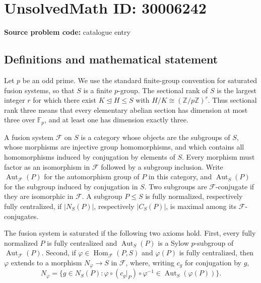 \documentclass[11pt]{article}
\newcommand{\Z}{\mathbb{Z}}
\newcommand{\F}{\mathbb{F}}
\begin{document}
\section*{UnsolvedMath ID: 30006242}
\textbf{Source problem code:} catalogue entry
\subsection{Definitions and mathematical statement}
Let \(p\) be an odd prime. We use the standard finite-group convention for saturated fusion systems, so that \(S\) is a finite \(p\)-group. The sectional rank of \(S\) is the largest integer \(r\) for which there exist \(K\trianglelefteq H\leq S\) with \(H/K\cong (\Z/p\Z)^r\). Thus sectional rank three means that every elementary abelian section has dimension at most three over \(\F_p\), and at least one has dimension exactly three.

A fusion system \(\mathcal F\) on \(S\) is a category whose objects are the subgroups of \(S\), whose morphisms are injective group homomorphisms, and which contains all homomorphisms induced by conjugation by elements of \(S\). Every morphism must factor as an isomorphism in \(\mathcal F\) followed by a subgroup inclusion. Write \(\operatorname{Aut}_{\mathcal F}(P)\) for the automorphism group of \(P\) in this category, and \(\operatorname{Aut}_S(P)\) for the subgroup induced by conjugation in \(S\). Two subgroups are \(\mathcal F\)-conjugate if they are isomorphic in \(\mathcal F\). A subgroup \(P\leq S\) is fully normalized, respectively fully centralized, if \(|N_S(P)|\), respectively \(|C_S(P)|\), is maximal among its \(\mathcal F\)-conjugates.

The fusion system is saturated if the following two axioms hold. First, every fully normalized \(P\) is fully centralized and \(\operatorname{Aut}_S(P)\) is a Sylow \(p\)-subgroup of \(\operatorname{Aut}_{\mathcal F}(P)\). Second, if \(\varphi\in\operatorname{Hom}_{\mathcal F}(P,S)\) and \(\varphi(P)\) is fully centralized, then \(\varphi\) extends to a morphism \(N_\varphi\to S\) in \(\mathcal F\), where, writing \(c_g\) for conjugation by \(g\),
\[
N_\varphi=\{g\in N_S(P):\varphi\circ(c_g|_P)\circ\varphi^{-1}\in\operatorname{Aut}_S(\varphi(P))\}.
\]
\end{document}
